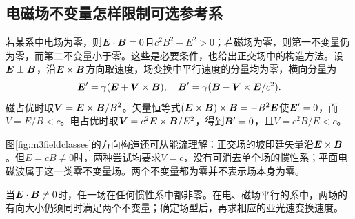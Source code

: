 \subsection{电磁场不变量怎样限制可选参考系}
若某系中电场为零，则$\bm{E}\cdot\bm{B}=0$且$c^2B^2-E^2>0$；若磁场为零，则第一不变量仍为零，而第二不变量小于零。这些是必要条件，也给出正交场中的构造方法。设$\bm{E}\perp\bm{B}$，沿$\bm{E}\times\bm{B}$方向取速度，场变换中平行速度的分量均为零，横向分量为
\[
 \bm{E}'=\gamma(\bm{E}+\bm{V}\times\bm{B}),\quad
 \bm{B}'=\gamma(\bm{B}-\bm{V}\times\bm{E}/c^2).
\]
磁占优时取$\bm{V}=\bm{E}\times\bm{B}/B^2$。矢量恒等式$(\bm{E}\times\bm{B})\times\bm{B}=-B^2\bm{E}$使$\bm{E}'=0$，而$V=E/B<c$。电占优时取$\bm{V}=c^2\bm{E}\times\bm{B}/E^2$，得到$\bm{B}'=0$，且$V=c^2B/E<c$。

图\ref{fig:m3fieldclasses}的方向构造还可从能流理解：正交场的坡印廷矢量沿$\bm{E}\times\bm{B}$。但$E=cB\ne0$时，两种尝试均要求$V=c$，没有可消去单个场的惯性系；平面电磁波属于这一类零不变量场。两个不变量都为零并不表示场本身为零。

当$\bm{E}\cdot\bm{B}\ne0$时，任一场在任何惯性系中都非零。在电、磁场平行的系中，两场的有向大小仍须同时满足两个不变量；确定场型后，再求相应的亚光速变换速度。
